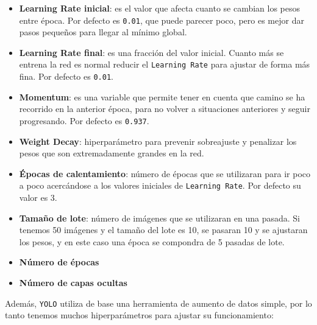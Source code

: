 \begin{itemize}
    \item \textbf{Learning Rate inicial}: es el valor que afecta cuanto se cambian los pesos entre época. Por defecto es \texttt{0.01}, que puede parecer poco, pero es mejor dar pasos pequeños para llegar al mínimo global.
    \item \textbf{Learning Rate final}: es una fracción del valor inicial. Cuanto más se entrena la red es normal reducir el \texttt{Learning Rate} para ajustar de forma más fina. Por defecto es \texttt{0.01}.
    \item \textbf{Momentum}: es una variable que permite tener en cuenta que camino se ha recorrido en la anterior época, para no volver a situaciones anteriores y seguir progresando. Por defecto es \texttt{0.937}.
    \item \textbf{Weight Decay}: hiperparámetro para prevenir sobreajuste y penalizar los pesos que son extremadamente grandes en la red.
    \item \textbf{Épocas de calentamiento}: número de épocas que se utilizaran para ir poco a poco acercándose a los valores iniciales de \texttt{Learning Rate}. Por defecto su valor es 3.
    \item \textbf{Tamaño de lote}: número de imágenes que se utilizaran en una pasada. Si tenemos 50 imágenes y el tamaño del lote es 10, se pasaran 10 y se ajustaran los pesos, y en este caso una época se compondra 
    de 5 pasadas de lote.
    \item \textbf{Número de épocas}
    \item \textbf{Número de capas ocultas}
\end{itemize}
\clearpage
Además, \texttt{YOLO} utiliza de base una herramienta de aumento de datos simple, por lo tanto tenemos muchos hiperparámetros para ajustar su funcionamiento:

